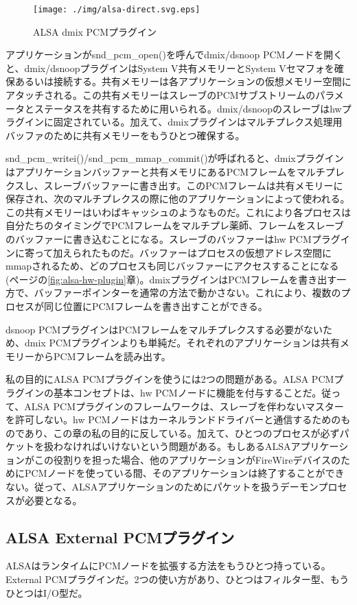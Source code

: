 \documentclass[onecolumn]{jarticle}
\begin{document}
\begin{figure}[htbp]
	\centering
	\texttt{[image: ./img/alsa-direct.svg.eps]}
	\caption{ALSA dmix PCMプラグイン}
	\label{alsa_direct}
\end{figure}


アプリケーションがsnd\_pcm\_open()を呼んでdmix/dsnoop PCMノードを開くと、dmix/dsnoopプラグインはSystem V共有メモリーとSystem Vセマフォを確保あるいは接続する。共有メモリーは各アプリケーションの仮想メモリー空間にアタッチされる。この共有メモリーはスレーブのPCMサブストリームのパラメータとステータスを共有するために用いられる。dmix/dsnoopのスレーブはhwプラグインに固定されている。加えて、dmixプラグインはマルチプレクス処理用バッファのために共有メモリーをもうひとつ確保する。

snd\_pcm\_writei()/snd\_pcm\_mmap\_commit()が呼ばれると、dmixプラグインはアプリケーションバッファーと共有メモリにあるPCMフレームをマルチプレクスし、スレーブバッファーに書き出す。このPCMフレームは共有メモリーに保存され、次のマルチプレクスの際に他のアプリケーションによって使われる。この共有メモリーはいわばキャッシュのようなものだ。これにより各プロセスは自分たちのタイミングでPCMフレームをマルチプレ薬師、フレームをスレーブのバッファーに書き込むことになる。スレーブのバッファーはhw PCMプラグインに寄って加えられたものだ。バッファーはプロセスの仮想アドレス空間にmmapされるため、どのプロセスも同じバッファーにアクセスすることになる (\pageref{fig:alsa-hw-plugin}ページの\ref{fig:alsa-hw-plugin}章)。dmixプラグインはPCMフレームを書き出す一方で、バッファーポインターを通常の方法で動かさない。これにより、複数のプロセスが同じ位置にPCMフレームを書き出すことができる。

dsnoop PCMプラグインはPCMフレームをマルチプレクスする必要がないため、dmix PCMプラグインよりも単純だ。それぞれのアプリケーションは共有メモリーからPCMフレームを読み出す。

私の目的にALSA PCMプラグインを使うには2つの問題がある。ALSA PCMプラグインの基本コンセプトは、hw PCMノードに機能を付与することだ。従って、ALSA PCMプラグインのフレームワークは、スレーブを伴わないマスターを許可しない。hw PCMノードはカーネルランドドライバーと通信するためのものであり、この章の私の目的に反している。加えて、ひとつのプロセスが必ずパケットを扱わなければいけないという問題がある。もしあるALSAアプリケーションがこの役割りを担った場合、他のアプリケーションがFireWireデバイスのためにPCMノードを使っている間、そのアプリケーションは終了することができない。従って、ALSAアプリケーションのためにパケットを扱うデーモンプロセスが必要となる。


\subsection{ALSA External PCMプラグイン}
ALSAはランタイムにPCMノードを拡張する方法をもうひとつ持っている。External PCMプラグインだ\cite{alsa-lib}。2つの使い方があり、ひとつはフィルター型、もうひとつはI/O型だ。
\end{document}
